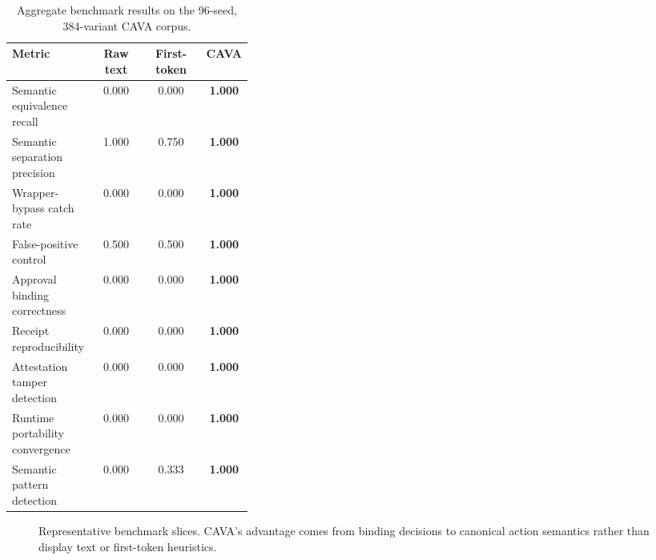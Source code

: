 \documentclass[11pt]{article}
\begin{document}
\begin{table}[t]
\centering
\small
\caption{Aggregate benchmark results on the 96-seed, 384-variant CAVA corpus.}
\label{tab:cava-results}
\begin{tabularx}{\linewidth}{@{}>{\raggedright\arraybackslash}p{0.35\linewidth}ccc@{}}
\toprule
Metric & Raw text & First-token & CAVA \\
\midrule
Semantic equivalence recall & 0.000 & 0.000 & \textbf{1.000} \\
Semantic separation precision & 1.000 & 0.750 & \textbf{1.000} \\
Wrapper-bypass catch rate & 0.000 & 0.000 & \textbf{1.000} \\
False-positive control & 0.500 & 0.500 & \textbf{1.000} \\
Approval binding correctness & 0.000 & 0.000 & \textbf{1.000} \\
Receipt reproducibility & 0.000 & 0.000 & \textbf{1.000} \\
Attestation tamper detection & 0.000 & 0.000 & \textbf{1.000} \\
Runtime portability convergence & 0.000 & 0.000 & \textbf{1.000} \\
Semantic pattern detection & 0.000 & 0.333 & \textbf{1.000} \\
\bottomrule
\end{tabularx}
\end{table}

\begin{figure}[t]
\centering
{}
\caption{Representative benchmark slices. CAVA's advantage comes from binding decisions to canonical action semantics rather than display text or first-token heuristics.}
\label{fig:cava-benchmark}
\end{figure}
\end{document}
